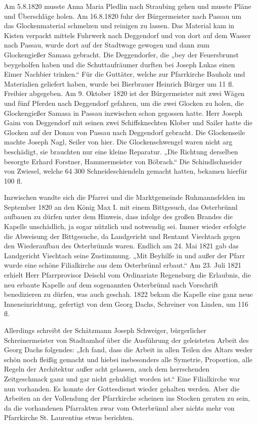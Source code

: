 \documentclass[12pt,a4paper]{book}
\begin{document}
Am 5.8.1820 musste Anna Maria Pledlin nach Straubing gehen und musste Pläne und
Überschläge holen. Am 16.8.1820 fuhr der Bürgermeister nach Passau um das
Glockenmaterial schmelzen und reinigen zu lassen. Das Material kam in Kisten
verpackt mittels Fuhrwerk nach Deggendorf und von dort auf dem Wasser nach
Passau, wurde dort auf der Stadtwage gewogen und dann zum Glockengießer Samasa
gebracht. Die Deggendorfer, die „bey der Feuersbrunst beygeholfen haben und die
Schuttaufräumer durften bei Joseph Lukas einen Eimer Nachbier trinken.“ Für die
Guttäter, welche zur Pfarrkirche Bauholz und Materialien geliefert haben, wurde
bei Bierbrauer Heinrich Bürger um 11 fl. Freibier abgegeben. Am 9. Oktober 1820
ist der Bürgermeister mit zwei Wägen und fünf Pferden nach Deggendorf gefahren,
um die zwei Glocken zu holen, die Glockengießer Samasa in Passau inzwischen
schon gegossen hatte. Herr Joseph Gaim von Deggendorf mit seinen zwei
Schiffsknechten Klober und Sailer hatte die Glocken auf der Donau von Passau
nach Deggendorf gebracht. Die Glockenseile machte Joseph Nagl, Seiler von hier.
Die Glockenschwengel waren nicht arg beschädigt, sie brauchten nur eine kleine
Reparatur. „Die Richtung derselben besorgte Erhard Forstner, Hammermeister von
Böbrach.“ Die Schindlschneider von Zwiesel, welche 64 300 Schneideschiendeln
gemacht hatten, bekamen hierfür 100 fl.

Inzwischen wandte sich die Pfarrei und die Marktgemeinde Ruhmannsfelden im
September 1820 an den König Max I. mit einem Bittgesuch, das Osterbrünnl
aufbauen zu dürfen unter dem Hinweis, dass infolge des großen Brandes die
Kapelle unschädlich, ja sogar nützlich und notwendig sei. Immer wieder erfolgte
die Abweisung der Bittgesuche, da Landgericht und Rentamt Viechtach gegen den
Wiederaufbau des Osterbrünnls waren. Endlich am 24. Mai 1821 gab das Landgericht
Viechtach seine Zustimmung. „Mit Beyhilfe in und außer der Pfarr wurde eine
schöne Filialkirche aus dem Osterbrünnl erbaut.“ Am 23. Juli 1821 erhielt Herr
Pfarrprovisor Deischl vom Ordinariate Regensburg die Erlaubnis, die neu erbaute
Kapelle auf dem sogenannten Osterbrünnl nach Vorschrift benedizieren zu dürfen,
was auch geschah. 1822 bekam die Kapelle eine ganz neue Inneneinrichtung,
gefertigt von dem Georg Dachs, Schreiner von Linden, um 116 fl.

Allerdings schreibt der Schätzmann Joseph Schweiger, bürgerlicher
Schreinermeister von Stadtamhof über die Ausführung der geleisteten Arbeit des
Georg Dachs folgendes: „Ich fand, dass die Arbeit in allen Teilen des Altars
weder schön noch fleißig gemacht und hiebei insbesonders alle Symetrie,
Proportion, alle Regeln der Architektur außer acht gelassen, auch dem
herrschenden Zeitgeschmack ganz und gar nicht gehuldigt worden ist.“ Eine
Filialkirche war nun vorhanden. Es konnte der Gottesdienst wieder gehalten
werden. Aber die Arbeiten an der Vollendung der Pfarrkirche scheinen ins Stocken
geraten zu sein, da die vorhandenen Pfarrakten zwar vom Osterbrünnl aber nichts
mehr von Pfarrkirche St. Laurentius etwas berichten.
\end{document}
